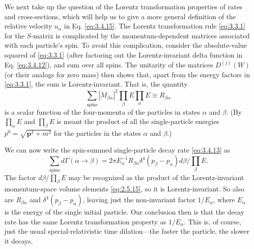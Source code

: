 We next take up the question of the Lorentz transformation properties of rates and cross-sections,
which will help us to give a more general definition of the relative velocity $u_\alpha$ in
Eq. \eqref{eq:3.4.15}. The Lorentz transformation rule \eqref{eq:3.3.1} for the $S$-matrix is complicated by the
momentum-dependent matrices associated with each particle's spin. To avoid this complication,
consider the absolute-value squared of \eqref{eq:3.3.1} (after factoring out the Lorentz-invariant delta
function in Eq. \eqref{eq:3.4.12}), and sum over all spins. The unitarity of the matrices $D^{(j)}(W)$
(or their analogs for zero mass) then shows that, apart from the energy factors in \eqref{eq:3.3.1}, the
sum is Lorentz-invariant. That is, the quantity
\begin{equation}
 \sum_{\mathrm{spins}}|M_{\beta\alpha}|^2\prod_\beta E\prod_\alpha E
 \equiv R_{\beta\alpha}
 \tag{3.4.16}\label{eq:3.4.16}
\end{equation}
is a scalar function of the four-momenta of the particles in states $\alpha$ and $\beta$.
(By $\prod_\alpha E$ and $\prod_\beta E$ is meant the product of all the single-particle energies
$p^0=\sqrt{\mathbf{p}^2+m^2}$ for the particles in the states $\alpha$ and $\beta$.)

We can now write the spin-summed single-particle decay rate \eqref{eq:3.4.13} as
\[
 \sum_{\mathrm{spins}}d\Gamma(\alpha\to\beta)
 =2\pi E_\alpha^{-1}R_{\beta\alpha}\delta^4(p_\beta-p_\alpha)d\beta
 /\prod_\beta E.
\]
The factor $d\beta/\prod_\beta E$ may be recognized as the product of the Lorentz-invariant
momentum-space volume elements \eqref{eq:2.5.15}, so it is Lorentz-invariant. So also are
$R_{\beta\alpha}$ and $\delta^4(p_\beta-p_\alpha)$, leaving just the non-invariant factor
$1/E_\alpha$, where $E_\alpha$ is the energy of the single initial particle. Our conclusion
then is that the decay rate has the same Lorentz transformation property as $1/E_\alpha$.
This is, of course, just the usual special-relativistic time dilation---the faster the particle,
the slower it decays.

